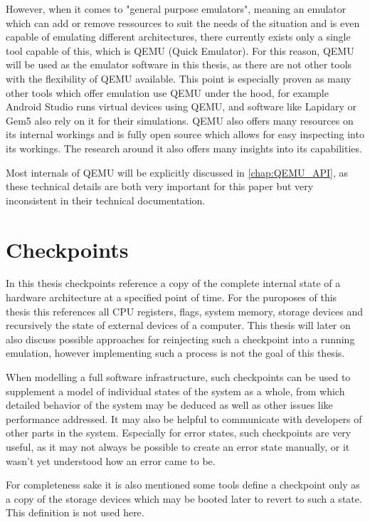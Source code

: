 However, when it comes to "general purpose emulators",
meaning an emulator which can add or remove ressources to suit the needs of the situation
and is even capable of emulating different architectures,
there currently exists only a single tool capable of this,
which is QEMU (Quick Emulator).
For this reason, QEMU will be used as the emulator software in this thesis,
as there are not other tools with the flexibility of QEMU available.
This point is especially proven as many other tools which offer emulation
use QEMU under the hood, for example Android Studio runs virtual devices using QEMU,
and software like Lapidary\cite{lapidary} or Gem5\cite{gem5} also rely on it for their simulations.
QEMU also offers many resources on its internal workings and is fully open source
which allows for easy inspecting into its workings.
The research around it also offers many insights into its capabilities.

Most internals of QEMU will be explicitly discussed in \autoref{chap:QEMU_API},
as these technical details are both very important for this paper
but very inconsistent in their technical documentation.

\section{Checkpoints}
In this thesis checkpoints reference a copy of the complete internal state of a hardware architecture at a specified point of time.
For the puroposes of this thesis this references all CPU registers, flags, system memory,
storage devices and recursively the state of external devices of a computer.
This thesis will later on also discuss possible approaches for reinjecting such a checkpoint
into a running emulation, however implementing such a process is not the goal of this thesis.

When modelling a full software infrastructure,
such checkpoints can be used to supplement a model of individual states of the system as a whole,
from which detailed behavior of the system may be deduced
as well as other issues like performance addressed.
It may also be helpful to communicate with developers of other parts in the system.
Especially for error states, such checkpoints are very useful,
as it may not always be possible to create an error state manually,
or it wasn't yet understood how an error came to be.

For completeness sake it is also mentioned some tools define a checkpoint only as a copy of the storage devices
which may be booted later to revert to such a state.
This definition is not used here.

